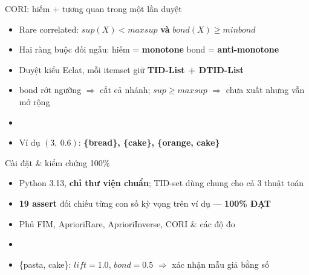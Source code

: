 \documentclass[aspectratio=169,11pt]{beamer}
\begin{document}
\begin{frame}{CORI: hiếm + tương quan trong một lần duyệt}
\begin{itemize}\itemsep0.55em
  \item Rare correlated: $sup(X) < maxsup$ \textbf{và} $bond(X) \ge minbond$
  \item Hai ràng buộc đối ngẫu: hiếm = \textbf{monotone} \quad\textbullet\quad bond = \textbf{anti-monotone}
  \item Duyệt kiểu Eclat, mỗi itemset giữ \textbf{TID-List + DTID-List}
  \item bond rớt ngưỡng $\Rightarrow$ cắt cả nhánh; $sup \ge maxsup$ $\Rightarrow$ chưa xuất nhưng vẫn mở rộng
  \item[]
  \item Ví dụ $(3,\ 0.6)$: \textbf{\{bread\}, \{cake\}, \{orange, cake\}} 
\end{itemize}
\end{frame}

\begin{frame}{Cài đặt \& kiểm chứng 100\%}
\begin{itemize}\itemsep0.6em
  \item Python 3.13, \textbf{chỉ thư viện chuẩn}; TID-set dùng chung cho cả 3 thuật toán
  \item \textbf{19 assert} đối chiếu từng con số kỳ vọng trên ví dụ --- {\color{okgreen}\textbf{100\% ĐẠT}}
  \item Phủ FIM, AprioriRare, AprioriInverse, CORI \& các độ đo
  \item[]
  \item \{pasta, cake\}: $lift = 1.0$, $bond = 0.5$ $\Rightarrow$ xác nhận mẫu giả bằng số
\end{itemize}
\end{frame}
\end{document}
